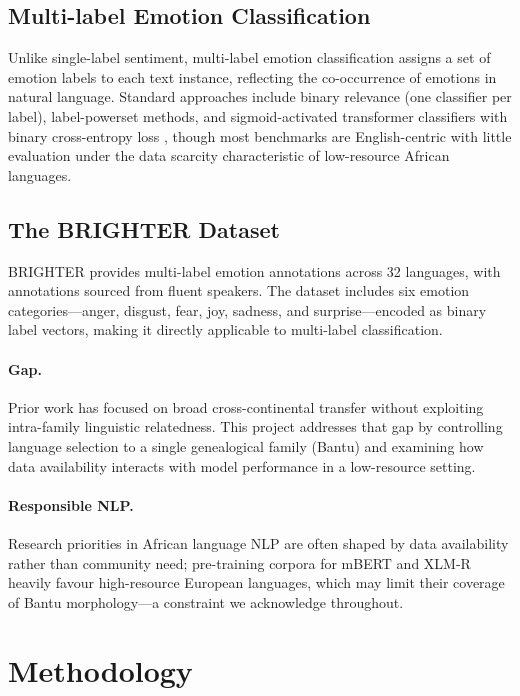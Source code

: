 \documentclass[11pt]{article}
\begin{document}
\subsection{Multi-label Emotion Classification}

Unlike single-label sentiment, multi-label emotion classification assigns
a set of emotion labels to each text instance, reflecting the co-occurrence
of emotions in natural language.
Standard approaches include binary relevance (one classifier per label),
label-powerset methods, and sigmoid-activated transformer classifiers with
binary cross-entropy loss \citep{devlin2019bert, conneau2020unsupervised},
though most benchmarks are English-centric with little evaluation under the
data scarcity characteristic of low-resource African languages.

\subsection{The BRIGHTER Dataset}

BRIGHTER \citep{abdulmumin2024brighter} provides multi-label emotion
annotations across 32 languages, with annotations sourced from fluent speakers.
The dataset includes six emotion categories---anger, disgust, fear, joy,
sadness, and surprise---encoded as binary label vectors, making it directly
applicable to multi-label classification.

\paragraph{Gap.}
Prior work has focused on broad cross-continental transfer without exploiting
intra-family linguistic relatedness.
This project addresses that gap by controlling language selection to a single
genealogical family (Bantu) and examining how data availability interacts with
model performance in a low-resource setting.

\paragraph{Responsible NLP.}
Research priorities in African language NLP are often shaped by data
availability rather than community need; pre-training corpora for mBERT and
XLM-R heavily favour high-resource European languages, which may limit their
coverage of Bantu morphology---a constraint we acknowledge throughout.

\section{Methodology}
\end{document}
